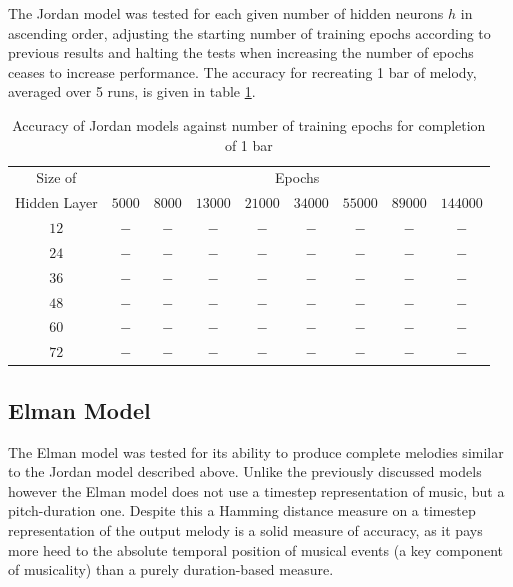\documentclass[ author={Stephen Livermore-Tozer},
				supervisor={Dr. Peter Flach},
				degree={MEng},
				title={Algorithmic Co-composition Using Machine Learning},
				subtitle={},
				type={research},
				year={2016} ]{dissertation}
\begin{document}
	The Jordan model was tested for each given number of hidden neurons $h$ in ascending order, adjusting the starting number of training epochs according to previous results and halting the tests when increasing the number of epochs ceases to increase performance. The accuracy for recreating 1 bar of melody, averaged over 5 runs, is given in table \ref{tab:jordan-1-bar-results}.
	
	\begin{table}[htp]
		\begin{center}
			\begin{tabular}{ccccccccc}
				\toprule
				Size of& \multicolumn{8}{c}{Epochs}\\
				\cline{2-9}
				Hidden Layer& $5000$ & $8000$ & $13000$ & $21000$ & $34000$ & $55000$ & $89000$ & $144000$\\
				\hline
				$12$ & $-$ & $-$ & $-$ & $-$ & $-$ & $-$ & $-$ & $-$\\
				$24$ & $-$ & $-$ & $-$ & $-$ & $-$ & $-$ & $-$ & $-$\\
				$36$ & $-$ & $-$ & $-$ & $-$ & $-$ & $-$ & $-$ & $-$\\
				$48$ & $-$ & $-$ & $-$ & $-$ & $-$ & $-$ & $-$ & $-$\\
				$60$ & $-$ & $-$ & $-$ & $-$ & $-$ & $-$ & $-$ & $-$\\
				$72$ & $-$ & $-$ & $-$ & $-$ & $-$ & $-$ & $-$ & $-$\\
				\bottomrule
			\end{tabular}
		\end{center}
		\caption{Accuracy of Jordan models against number of training epochs for completion of 1 bar}
		\label{tab:jordan-1-bar-results}
	\end{table}
	
	\subsection{Elman Model}
	
	The Elman model was tested for its ability to produce complete melodies similar to the Jordan model described above. Unlike the previously discussed models however the Elman model does not use a timestep representation of music, but a pitch-duration one. Despite this a Hamming distance measure on a timestep representation of the output melody is a solid measure of accuracy, as it pays more heed to the absolute temporal position of musical events (a key component of musicality) than a purely duration-based measure.
	
\end{document}
